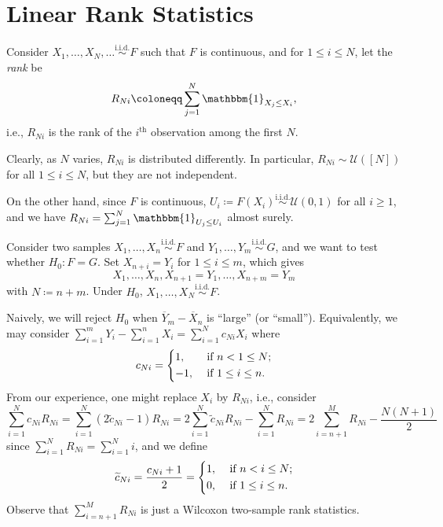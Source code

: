 \section{Linear Rank Statistics}
Consider \(X_1, \dots , X_N, \dots \overset{\text{i.i.d.} }{\sim } F\) such that \(F\) is continuous, and for \(1 \leq i \leq N\), let the \emph{rank} be
\[
	R_{Ni}
	\coloneqq \sum_{j=1}^{N} \mathbbm{1}_{X_j \leq X_i},
\]
i.e., \(R_{Ni}\) is the rank of the \(i^{\text{th} }\) observation among the first \(N\).

\begin{remark}
	Clearly, as \(N\) varies, \(R_{Ni}\) is distributed differently. In particular, \(R_{Ni} \sim \mathcal{U} ([N])\) for all \(1 \leq i \leq N\), but they are not independent.
\end{remark}

\begin{remark}
	On the other hand, since \(F\) is continuous, \(U_i \coloneqq F(X_i)\overset{\text{i.i.d.} }{\sim } \mathcal{U} (0, 1)\) for all \(i \geq 1\), and we have \(R_{Ni} = \sum_{j=1}^{N} \mathbbm{1}_{U_j \leq U_i} \) almost surely.
\end{remark}

\begin{eg}
	Consider two samples \(X_1, \dots , X_n \overset{\text{i.i.d.} }{\sim } F\) and \(Y_1, \dots , Y_m \overset{\text{i.i.d.} }{\sim } G\), and we want to test whether \(H_0 \colon F = G\). Set \(X_{n+i} = Y_i\) for \(1 \leq i \leq m\), which gives
	\[
		X_1, \dots , X_n , X_{n+1} = Y_1, \dots , X_{n+m} = Y_m
	\]
	with \(N \coloneqq n + m\). Under \(H_0\), \(X_1, \dots , X_N \overset{\text{i.i.d.} }{\sim } F\).

	Naively, we will reject \(H_0\) when \(\overline{Y} _m - \overline{X} _n\) is ``large'' (or ``small''). Equivalently, we may consider \(\sum_{i=1}^{m} Y_i - \sum_{i=1}^{n} X_i = \sum_{i=1}^{N} c_{Ni} X_i\) where
	\[
		c_{Ni}
		= \begin{dcases}
			1,  & \text{ if } n < 1 \leq N ;   \\
			-1, & \text{ if } 1 \leq i \leq n.
		\end{dcases}
	\]
	From our experience, one might replace \(X_i\) by \(R_{Ni}\), i.e., consider
	\[
		\sum_{i=1}^{N} c_{Ni} R_{Ni}
		= \sum_{i=1}^{N} (2 \widetilde{c} _{Ni} - 1) R_{Ni}
		= 2 \sum_{i=1}^{N} \widetilde{c} _{Ni} R_{Ni} - \sum_{i=1}^{N} R_{Ni}
		= 2 \sum_{i=n+1}^{M} R_{Ni} - \frac{N(N+1)}{2}
	\]
	since \(\sum_{i=1}^{N} R_{Ni} = \sum_{i=1}^{N} i\), and we define
	\[
		\widetilde{c} _{Ni}
		= \frac{c_{Ni} + 1}{2}
		= \begin{dcases}
			1, & \text{ if } n < i \leq N ;   \\
			0, & \text{ if } 1 \leq i \leq n.
		\end{dcases}
	\]
	Observe that \(\sum_{i=n+1}^{M} R_{Ni}\) is just a Wilcoxon two-sample rank statistics.
\end{eg}

